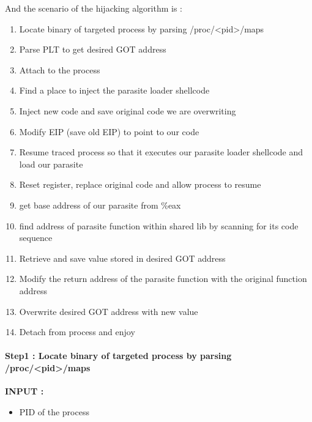 \documentclass[letterpaper,10pt,english]{sphinxmanual}
\begin{document}
And the scenario of the hijacking algorithm is :
\begin{enumerate}
\item {} 
Locate binary of targeted process by parsing /proc/\textless{}pid\textgreater{}/maps

\item {} 
Parse PLT to get desired GOT address

\item {} 
Attach to the process

\item {} 
Find a place to inject the parasite loader shellcode

\item {} 
Inject new code and save original code we are overwriting

\item {} 
Modify EIP (save old EIP) to point to our code

\item {} 
Resume traced process so that it executes our parasite loader shellcode and load our parasite

\item {} 
Reset register, replace original code and allow process to resume

\item {} 
get base address of our parasite from \%eax

\item {} 
find address of parasite function within shared lib by scanning for its code sequence

\item {} 
Retrieve and save value stored in desired GOT address

\item {} 
Modify the return address of the parasite function with the original function address

\item {} 
Overwrite desired GOT address with new value

\item {} 
Detach from process and enjoy

\end{enumerate}


\paragraph{Step1 : Locate binary of targeted process by parsing /proc/\textless{}pid\textgreater{}/maps}
\label{Annexes/index:step1-locate-binary-of-targeted-process-by-parsing-proc-pid-maps}
\textbf{INPUT :}
\begin{itemize}
\item {} 
PID of the process

\end{itemize}
\end{document}
